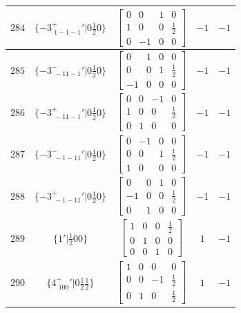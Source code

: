 \documentclass[fleqn,8pt]{jsarticle}
\begin{document}
\begin{longtable}{ccccc}
$ 284 $ & $ \{-3^{+}_{\,\,1-1-1}{}'|0 \frac{1}{2} 0\} $ & $ \begin{bmatrix} 0 & 0 & 1 & 0 \\ 1 & 0 & 0 & \frac{1}{2} \\ 0 & -1 & 0 & 0 \end{bmatrix} $ & $ -1 $ & $ -1 $ \\ \hline
$ 285 $ & $ \{-3^{-}_{\,\,-11-1}{}'|0 \frac{1}{2} 0\} $ & $ \begin{bmatrix} 0 & 1 & 0 & 0 \\ 0 & 0 & 1 & \frac{1}{2} \\ -1 & 0 & 0 & 0 \end{bmatrix} $ & $ -1 $ & $ -1 $ \\ \hline
$ 286 $ & $ \{-3^{+}_{\,\,-11-1}{}'|0 \frac{1}{2} 0\} $ & $ \begin{bmatrix} 0 & 0 & -1 & 0 \\ 1 & 0 & 0 & \frac{1}{2} \\ 0 & 1 & 0 & 0 \end{bmatrix} $ & $ -1 $ & $ -1 $ \\ \hline
$ 287 $ & $ \{-3^{-}_{\,\,-1-11}{}'|0 \frac{1}{2} 0\} $ & $ \begin{bmatrix} 0 & -1 & 0 & 0 \\ 0 & 0 & 1 & \frac{1}{2} \\ 1 & 0 & 0 & 0 \end{bmatrix} $ & $ -1 $ & $ -1 $ \\ \hline
$ 288 $ & $ \{-3^{+}_{\,\,-1-11}{}'|0 \frac{1}{2} 0\} $ & $ \begin{bmatrix} 0 & 0 & 1 & 0 \\ -1 & 0 & 0 & \frac{1}{2} \\ 0 & 1 & 0 & 0 \end{bmatrix} $ & $ -1 $ & $ -1 $ \\ \hline
$ 289 $ & $ \{1{}'|\frac{1}{2} 0 0\} $ & $ \begin{bmatrix} 1 & 0 & 0 & \frac{1}{2} \\ 0 & 1 & 0 & 0 \\ 0 & 0 & 1 & 0 \end{bmatrix} $ & $ 1 $ & $ -1 $ \\ \hline
$ 290 $ & $ \{4^{+}_{\,\,100}{}'|0 \frac{1}{2} \frac{1}{2}\} $ & $ \begin{bmatrix} 1 & 0 & 0 & 0 \\ 0 & 0 & -1 & \frac{1}{2} \\ 0 & 1 & 0 & \frac{1}{2} \end{bmatrix} $ & $ 1 $ & $ -1 $ \\ \hline

\end{longtable}
\end{document}
